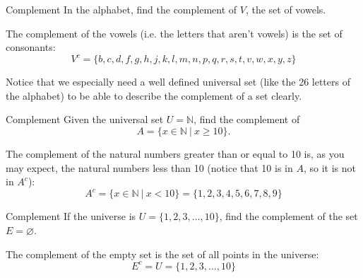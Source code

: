 \begin{example}[https://www.youtube.com/watch?v=6ZaKLBWs0pQ&list=PLfmpjsIzhztuvrh-T2Owgo_gO84qypSBG&index=9]{Complement}
In the alphabet, find the complement of $V$, the set of vowels.

\sol
The complement of the vowels (i.e. the letters that aren't vowels) is the set of consonants:
\[\boxed{V^c = \{b,c,d,f,g,h,j,k,l,m,n,p,q,r,s,t,v,w,x,y,z\}}\]

Notice that we especially need a well defined universal set (like the 26 letters of the alphabet) to be able to describe the complement of a set clearly.
\end{example}

\begin{example}[https://www.youtube.com/watch?v=xuF80sH5nE4&list=PLfmpjsIzhztuvrh-T2Owgo_gO84qypSBG&index=10]{Complement}
Given the universal set $U = \mathbb{N}$, find the complement of \[A = \{x \in \mathbb{N}\ |\ x \geq 10\}.\]

\sol
The complement of the natural numbers greater than or equal to 10 is, as you may expect, the natural numbers less than 10 (notice that 10 is in $A$, so it is not in $A^c$):
\[\boxed{A^c = \{x \in \mathbb{N}\ |\ x < 10\} = \{1,2,3,4,5,6,7,8,9\}}\]
\end{example}

\begin{example}[https://www.youtube.com/watch?v=CQkDnkSmXag&list=PLfmpjsIzhztuvrh-T2Owgo_gO84qypSBG&index=11]{Complement}
If the universe is $U = \{1,2,3,\ldots,10\}$, find the complement of the set $E=\varnothing$.

\sol
The complement of the empty set is the set of all points in the universe:
\[\boxed{E^c = U = \{1,2,3,\ldots,10\}}\]
\end{example}
\pagebreak

